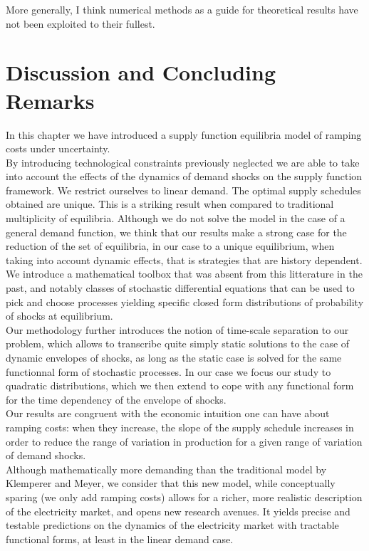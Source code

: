 More generally, I think numerical methods as a guide for theoretical results have not been exploited to their fullest.  

\section{Discussion and Concluding Remarks}\label{ccl}

In this chapter we have introduced a supply function equilibria model of ramping costs under uncertainty.\\

By introducing technological constraints previously neglected we are able to take into account the effects of the dynamics of demand shocks on the supply function framework. We restrict ourselves to linear demand. The optimal supply schedules obtained are unique. This is a striking result when compared to traditional multiplicity of equilibria. Although we do not solve the model in the case of a general demand function, we think that our results make a strong case for the reduction of the set of equilibria, in our case to a unique equilibrium, when taking into account dynamic effects, that is strategies that are history dependent. \\

We introduce a mathematical toolbox that was absent from this litterature in the past, and notably classes of stochastic differential equations that can be used to pick and choose processes yielding specific closed form distributions of probability of shocks at equilibrium. \\

Our methodology further introduces the notion of time-scale separation to our problem, which allows to transcribe quite simply static solutions to the case of dynamic envelopes of shocks, as long as the static case is solved for the same functionnal form of stochastic processes. In our case we focus our study to quadratic distributions, which we then extend to cope with any functional form for the time dependency of the envelope of shocks.\\

Our results are congruent with the economic intuition one can have about ramping costs: when they increase, the slope of the supply schedule increases in order to reduce the range of variation in production for a given range of variation of demand shocks.\\

Although mathematically more demanding than the traditional model by Klemperer and Meyer, we consider that this new model, while conceptually sparing (we only add ramping costs) allows for a richer, more realistic description of the electricity market, and opens new research avenues.  It yields precise and testable predictions on the dynamics of the electricity market with tractable functional forms, at least in the linear demand case. \\

